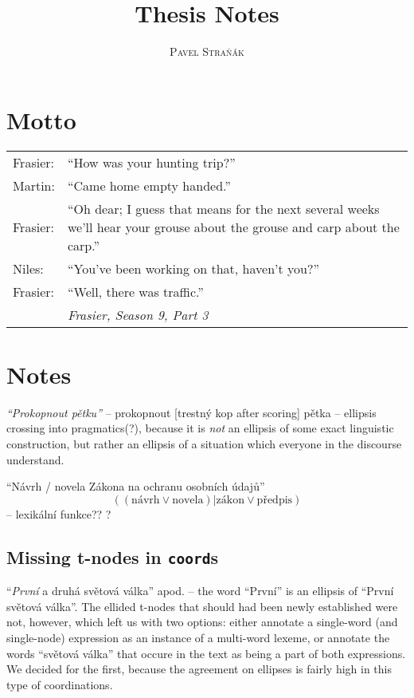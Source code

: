 \documentclass[11pt, a4paper]{book}
\title{Thesis Notes}
\author{\textsc{Pavel Straňák}}
\def\code{\texttt}
\begin{document}
\maketitle

\section*{Motto}
\begin{tabular}{@{} lp{11cm} @{}} %
Frasier: & ``How was your hunting trip?''\\
Martin: & ``Came home empty handed.''\\
Frasier: & ``Oh dear; I guess that means for the next several weeks we'll hear your grouse about the grouse and carp about the carp.''\\
Niles: & ``You've been working on that, haven't you?''\\
Frasier: & ``Well, there was traffic.''\\
 & \raggedleft\emph{Frasier, Season 9, Part 3}\\
\end{tabular}



\newpage
\section{Notes}

{\em``Prokopnout pětku''} -- prokopnout [trestný kop after scoring] pětka -- ellipsis crossing into pragmatics(?), because it is {\em not} an ellipsis of some exact linguistic construction, but rather an ellipsis of a situation which everyone in the discourse understand.  

``Návrh / novela Zákona na ochranu osobních údajů''  $$((\mathrm{návrh} \lor \mathrm{novela}) | \mathrm{zákon} \lor \mathrm{předpis})$$
-- lexikální funkce?? \citep{melcuk:1992} ?

\subsection{Missing t-nodes in \code{coord}s}
``\textit{První} a druhá světová válka'' apod. -- the word ``První'' is an ellipsis of ``První světová válka''. The ellided t-nodes that should had been newly established were not, however, which left us with two options: either annotate a single-word (and single-node) expression as an instance of a multi-word lexeme, or annotate the words ``světová válka'' that occure in the text as being a part of both expressions. We decided for the first, because the agreement on ellipses is fairly high in this type of coordinations.








%




\end{document}
